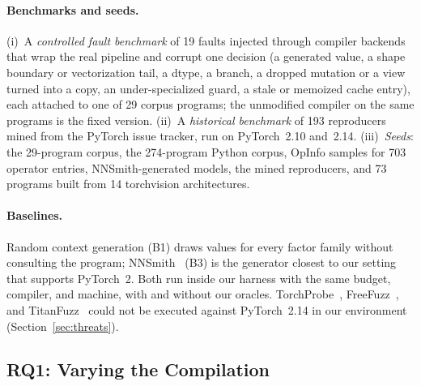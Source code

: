\paragraph{Benchmarks and seeds.} (i)~A \emph{controlled fault benchmark} of 19 faults injected through
compiler backends that wrap the real pipeline and corrupt one decision (a generated value, a shape boundary or
vectorization tail, a dtype, a branch, a dropped mutation or a view turned into a copy, an under-specialized
guard, a stale or memoized cache entry), each attached to one of 29 corpus programs; the unmodified compiler on
the same programs is the fixed version. (ii)~A \emph{historical benchmark} of 193 reproducers mined from the
PyTorch issue tracker, run on PyTorch~2.10 and~2.14. (iii)~\emph{Seeds}: the 29-program corpus, the
274-program Python corpus, OpInfo samples for 703 operator entries, NNSmith-generated models, the mined
reproducers, and 73 programs built from 14 torchvision architectures.

\paragraph{Baselines.} Random context generation (B1) draws values for every factor family without consulting
the program; NNSmith~\cite{DBLP:conf/asplos/LiuLRTLPZ23} (B3) is the generator closest to our setting that supports
PyTorch~2. Both run inside our harness with the same budget, compiler, and machine, with and without our
oracles. TorchProbe~\cite{DBLP:conf/aplas/SuGPS23}, FreeFuzz~\cite{DBLP:conf/icse/WeiDYZ22}, and TitanFuzz~\cite{DBLP:conf/issta/DengXPY023} could not be
executed against PyTorch~2.14 in our environment (Section~\ref{sec:threats}).

\subsection{RQ1: Varying the Compilation}
\label{sec:rq1}

